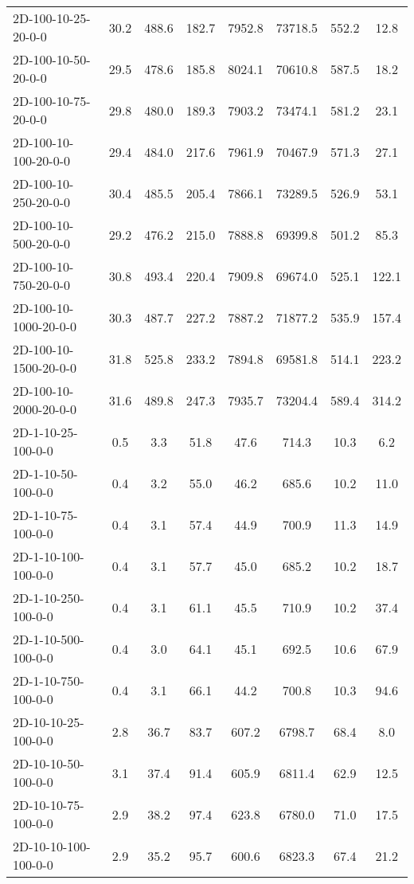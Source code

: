\documentclass{article}
\begin{document}
\begin{center}
\begin{table}[h]
\begin{tabular}{|l||c|c|c|c|c|c|c|}
        2D-100-10-25-20-0-0 & 30.2 & 488.6 & 182.7 & 7952.8 & 73718.5 & 552.2 & 12.8 \\
        2D-100-10-50-20-0-0 & 29.5 & 478.6 & 185.8 & 8024.1 & 70610.8 & 587.5 & 18.2 \\
        2D-100-10-75-20-0-0 & 29.8 & 480.0 & 189.3 & 7903.2 & 73474.1 & 581.2 & 23.1 \\
        2D-100-10-100-20-0-0 & 29.4 & 484.0 & 217.6 & 7961.9 & 70467.9 & 571.3 & 27.1 \\
        2D-100-10-250-20-0-0 & 30.4 & 485.5 & 205.4 & 7866.1 & 73289.5 & 526.9 & 53.1 \\
        2D-100-10-500-20-0-0 & 29.2 & 476.2 & 215.0 & 7888.8 & 69399.8 & 501.2 & 85.3 \\
        2D-100-10-750-20-0-0 & 30.8 & 493.4 & 220.4 & 7909.8 & 69674.0 & 525.1 & 122.1 \\
        2D-100-10-1000-20-0-0 & 30.3 & 487.7 & 227.2 & 7887.2 & 71877.2 & 535.9 & 157.4 \\
        2D-100-10-1500-20-0-0 & 31.8 & 525.8 & 233.2 & 7894.8 & 69581.8 & 514.1 & 223.2 \\
        2D-100-10-2000-20-0-0 & 31.6 & 489.8 & 247.3 & 7935.7 & 73204.4 & 589.4 & 314.2 \\
        \hline
        2D-1-10-25-100-0-0 & 0.5 & 3.3 & 51.8 & 47.6 & 714.3 & 10.3 & 6.2 \\
        2D-1-10-50-100-0-0 & 0.4 & 3.2 & 55.0 & 46.2 & 685.6 & 10.2 & 11.0 \\
        2D-1-10-75-100-0-0 & 0.4 & 3.1 & 57.4 & 44.9 & 700.9 & 11.3 & 14.9 \\
        2D-1-10-100-100-0-0 & 0.4 & 3.1 & 57.7 & 45.0 & 685.2 & 10.2 & 18.7 \\
        2D-1-10-250-100-0-0 & 0.4 & 3.1 & 61.1 & 45.5 & 710.9 & 10.2 & 37.4 \\
        2D-1-10-500-100-0-0 & 0.4 & 3.0 & 64.1 & 45.1 & 692.5 & 10.6 & 67.9 \\
        2D-1-10-750-100-0-0 & 0.4 & 3.1 & 66.1 & 44.2 & 700.8 & 10.3 & 94.6 \\
        \hline
        2D-10-10-25-100-0-0 & 2.8 & 36.7 & 83.7 & 607.2 & 6798.7 & 68.4 & 8.0 \\
        2D-10-10-50-100-0-0 & 3.1 & 37.4 & 91.4 & 605.9 & 6811.4 & 62.9 & 12.5 \\
        2D-10-10-75-100-0-0 & 2.9 & 38.2 & 97.4 & 623.8 & 6780.0 & 71.0 & 17.5 \\
        2D-10-10-100-100-0-0 & 2.9 & 35.2 & 95.7 & 600.6 & 6823.3 & 67.4 & 21.2 \\

\end{tabular}
\end{table}
\end{center}
\end{document}
